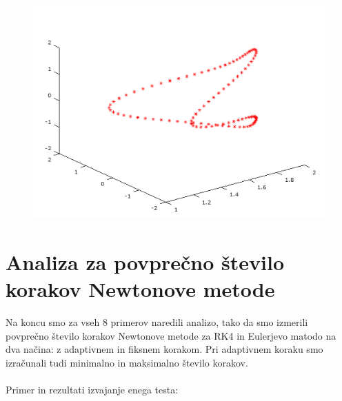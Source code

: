 \documentclass[12pt]{article}
\begin{document}
\begin{minipage}{\textwidth}
\begin{figure}[H]
    	\includegraphics[scale=0.5]{primer8_4} 
    \end{figure} 
    \end{minipage}
\newpage
\section{Analiza za povpre\v{c}no \v{s}tevilo korakov Newtonove metode} 
Na koncu smo za vseh 8 primerov naredili analizo, tako da smo izmerili povpre\v{c}no \v{s}tevilo korakov Newtonove metode za RK4 in Eulerjevo matodo na dva na\v{c}ina: z adaptivnem in fiksnem korakom. Pri adaptivnem koraku smo izra\v{c}unali tudi minimalno in maksimalno \v{s}tevilo korakov.\\ \\
Primer in rezultati izvajanje enega testa: 
\end{document}
